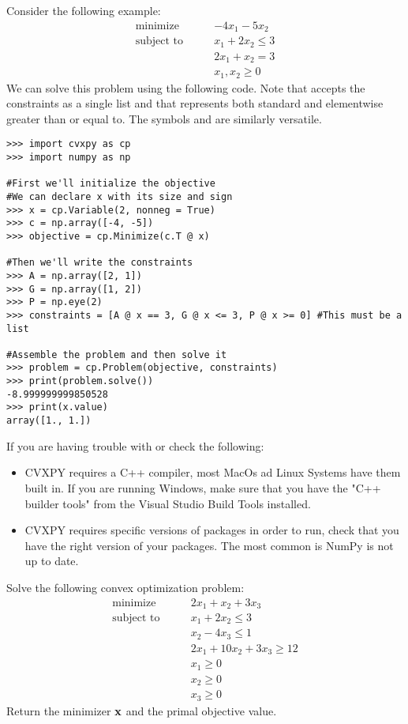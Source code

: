 Consider the following example:
\begin{align*}
\text{minimize}\qquad &-4x_1-5x_2 \\
\text{subject to}\qquad &x_1+2x_2 \leq 3 \\
	        &2x_1+x_2 = 3 \\
		&x_1, x_2 \geq 0
\end{align*}
We can solve this problem using the following code.
Note that  accepts the constraints as a single list and that \li{>=} represents both standard and elementwise greater than or equal to.
The symbols \li{<=} and \li{==} are similarly versatile.

\begin{lstlisting}
>>> import cvxpy as cp
>>> import numpy as np

#First we'll initialize the objective
#We can declare x with its size and sign
>>> x = cp.Variable(2, nonneg = True)	
>>> c = np.array([-4, -5])
>>> objective = cp.Minimize(c.T @ x)

#Then we'll write the constraints
>>> A = np.array([2, 1])
>>> G = np.array([1, 2])
>>> P = np.eye(2)
>>> constraints = [A @ x == 3, G @ x <= 3, P @ x >= 0] #This must be a list

#Assemble the problem and then solve it
>>> problem = cp.Problem(objective, constraints)
>>> print(problem.solve())
-8.999999999850528
>>> print(x.value)
array([1., 1.])
\end{lstlisting}

\begin{warn}
	If you are having trouble with  or  check the following:
	\begin{itemize}
		\item CVXPY requires a C++ compiler, most MacOs ad Linux Systems have them built in. 
		If you are running Windows, make sure that you have the "C++ builder tools" from the Visual Studio Build Tools installed.
		\item CVXPY requires specific versions of packages in order to run, check that you have the right version of your packages. 
		The most common is NumPy is not up to date.
	\end{itemize}
\end{warn}

\begin{problem}
Solve the following convex optimization problem:
\begin{align*}
\text{minimize}\qquad &2x_1+x_2+3x_3 \\
\text{subject to}\qquad &x_1+2x_2 \leq 3 \\
		&x_2-4x_3\leq 1\\
	        &2x_1+10x_2+3x_3 \geq 12 \\
		&x_1 \geq 0 \\
		&x_2 \geq 0 \\
		&x_3 \geq 0
\end{align*}
Return the minimizer $\mathbf{x}$ and the primal objective value.
\end{problem}
\pagebreak
